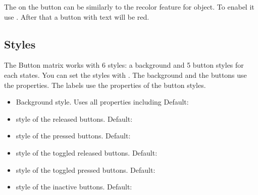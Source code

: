 \documentclass[letterpaper,10pt,english]{sphinxmanual}
\begin{document}
The  on the button can be  similarly to the recolor feature for {\hyperref[\detokenize{object-types/label::doc}]{}} object. To enabel it use . After that a button with  text will be red.


\subsection{Styles}
\label{\detokenize{object-types/btnm:styles}}
The Button matrix works with 6 styles: a background and 5 button styles for each states. You can set the styles with .
The background and the buttons use the  properties. The labels use the  properties of the button styles.
\begin{itemize}
\item {} 
 Background style. Uses all  properties including  Default: 

\item {} 
 style of the released  buttons. Default: 

\item {} 
 style of the pressed buttons. Default: 

\item {} 
 style of the toggled released  buttons. Default: 

\item {} 
 style of the toggled pressed  buttons. Default: 

\item {} 
 style of the inactive  buttons. Default: 

\end{itemize}
\end{document}
